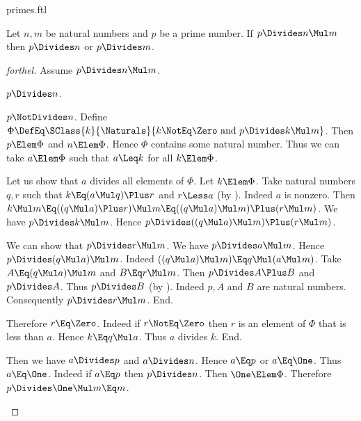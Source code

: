 \documentclass{stex}
\begin{document}
\begin{smodule}{primes.ftl}
\begin{proposition*}[forthel]
  Let $n, m$ be natural numbers and $p$ be a prime number.
  If $p \Divides n \Mul m$ then $p \Divides n$ or $p \Divides m$.
\end{proposition*}
\begin{proof}[forthel]
  Assume $p \Divides n \Mul m$.

  \begin{case}{$p \Divides n$.} \end{case}

  \begin{case}{$p \NotDivides n$.}
    Define $\Phi \DefEq \SClass{k}{\Naturals}{k \NotEq \Zero\text{ and }p \Divides k \Mul m}$.
    Then $p \Elem \Phi$ and $n \Elem \Phi$.
    Hence $\Phi$ contains some natural number.
    Thus we can take $a \Elem \Phi$ such that $a \Leq k$ for all $k \Elem \Phi$.

    Let us show that $a$ divides all elements of $\Phi$.
      Let $k \Elem \Phi$.
      Take natural numbers $q, r$ such that $k \Eq (a \Mul q) \Plus r$ and $r \Less a$ (by ).
      Indeed $a$ is nonzero.
      Then $k \Mul m
        \Eq ((q \Mul a) \Plus r) \Mul m
        \Eq ((q \Mul a) \Mul m) \Plus (r \Mul m)$.
      We have $p \Divides k \Mul m$.
      Hence $p \Divides ((q \Mul a) \Mul m) \Plus (r \Mul m)$.

      We can show that $p \Divides r \Mul m$.
        We have $p \Divides a \Mul m$.
        Hence $p \Divides (q \Mul a) \Mul m$.
        Indeed $((q \Mul a) \Mul m) \Eq q \Mul (a \Mul m)$. %
        Take $A \Eq (q \Mul a) \Mul m$ and $B \Eq r \Mul m$. %
        Then $p \Divides A \Plus B$ and $p \Divides A$.
        Thus $p \Divides B$ (by ).
        Indeed $p, A$ and $B$ are natural numbers.
        Consequently $p \Divides r \Mul m$.
      End.

      Therefore $r \Eq \Zero$.
      Indeed if $r \NotEq \Zero$ then $r$ is an element of $\Phi$ that is less than $a$.
      Hence $k \Eq q \Mul a$.
      Thus $a$ divides $k$.
    End.

    Then we have $a \Divides p$ and $a \Divides n$.
    Hence $a \Eq p$ or $a \Eq \One$.
    Thus $a \Eq \One$.
    Indeed if $a \Eq p$ then $p \Divides n$.
    Then $\One \Elem \Phi$.
    Therefore $p \Divides \One \Mul m \Eq m$.
  \end{case}
\end{proof}

\end{smodule}
\end{document}
